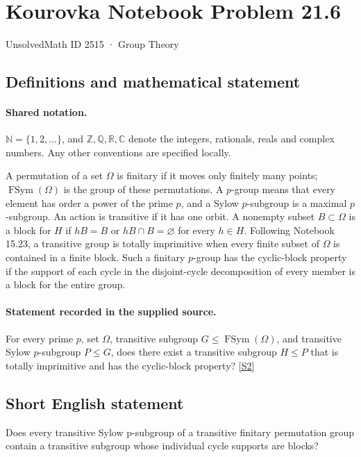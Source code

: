\documentclass[11pt]{article}
\newcommand{\sref}[2]{\hyperlink{source:#1:#2}{[S#2]}}
\begin{document}
\setcounter{section}{2514}
\section{Kourovka Notebook Problem 21.6}\label{2515}
{\small\sffamily UnsolvedMath ID 2515 · Group Theory}
\subsection{Definitions and mathematical statement}

\paragraph{Shared notation.}$\mathbb N=\{1,2,\ldots\}$, and $\mathbb Z,\mathbb Q,\mathbb R,\mathbb C$ denote the integers, rationals, reals and complex numbers. Any other conventions are specified locally.


A permutation of a set $\Omega$ is finitary if it moves only finitely many points; $\operatorname{FSym}(\Omega)$ is the group of these permutations. A $p$-group means that every element has order a power of the prime $p$, and a Sylow $p$-subgroup is a maximal $p$-subgroup. An action is transitive if it has one orbit. A nonempty subset $B\subset\Omega$ is a block for $H$ if $hB=B$ or $hB\cap B=\varnothing$ for every $h\in H$. Following Notebook 15.23, a transitive group is totally imprimitive when every finite subset of $\Omega$ is contained in a finite block. Such a finitary $p$-group has the cyclic-block property if the support of each cycle in the disjoint-cycle decomposition of every member is a block for the entire group.
\paragraph{Statement recorded in the supplied source.}
For every prime $p$, set $\Omega$, transitive subgroup $G\leq\operatorname{FSym}(\Omega)$, and transitive Sylow $p$-subgroup $P\leq G$, does there exist a transitive subgroup $H\leq P$ that is totally imprimitive and has the cyclic-block property? \sref{2515}{2}
\subsection{Short English statement}
Does every transitive Sylow p-subgroup of a transitive finitary permutation group contain a transitive subgroup whose individual cycle supports are blocks?
\end{document}
